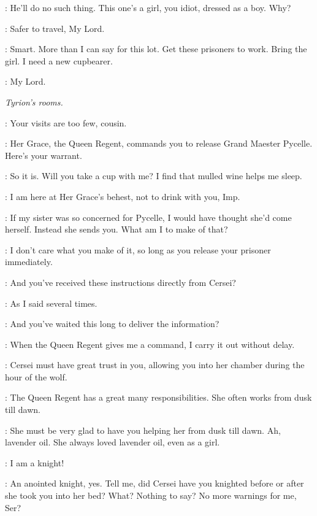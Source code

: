 \TYWIN: He'll do no such thing. This one's a girl, you idiot, dressed as a boy. Why? 

\ARYA: Safer to travel, My Lord. 

\TYWIN: Smart. More than I can say for this lot. Get these prisoners to work. Bring the girl. I need a new cupbearer. 

\MOUNTAIN: My Lord. 


\scene

\textit{Tyrion's rooms.} 


\TYRION: Your visits are too few, cousin. 

\LANCEL: Her Grace, the Queen Regent, commands you to release Grand Maester Pycelle. Here's your warrant. 

\TYRION: So it is. Will you take a cup with me? I find that mulled wine helps me sleep. 

\LANCEL: I am here at Her Grace's behest, not to drink with you, Imp. 

\TYRION: If my sister was so concerned for Pycelle, I would have thought she'd come herself. Instead she sends you. What am I to make of that? 

\LANCEL: I don't care what you make of it, so long as you release your prisoner immediately. 

\TYRION: And you've received these instructions directly from Cersei? 

\LANCEL: As I said several times. 

\TYRION: And you've waited this long to deliver the information? 

\LANCEL: When the Queen Regent gives me a command, I carry it out without delay. 

\TYRION: Cersei must have great trust in you, allowing you into her chamber during the hour of the wolf. 

\LANCEL: The Queen Regent has a great many responsibilities. She often works from dusk till dawn. 

\TYRION: She must be very glad to have you helping her from dusk till dawn. Ah, lavender oil. She always loved lavender oil, even as a girl. 

\LANCEL: I am a knight! 

\TYRION: An anointed knight, yes. Tell me, did Cersei have you knighted before or after she took you into her bed? What? Nothing to say? No more warnings for me, Ser? 

